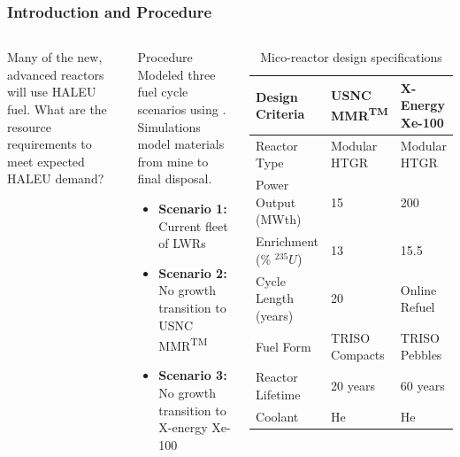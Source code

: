 \begin{frame}
  \frametitle{Introduction and Procedure}
  \begin{columns}
        \column[t]{5cm}
        Many of the new, advanced reactors will use \gls{HALEU} fuel. 
        What are the resource requirements to meet expected \gls{HALEU}
        demand?

        \begin{block}{Procedure}
            Modeled three fuel cycle scenarios using \Cyclus. Simulations 
            model materials from mine to final disposal.
            \begin{itemize}
                \item \textbf{Scenario 1:} Current fleet of \glspl{LWR}
                \item \textbf{Scenario 2:} No growth transition to \gls{USNC} \gls{MMR}\textsuperscript{TM}
                \item \textbf{Scenario 3:} No growth transition to X-energy Xe-100 
            \end{itemize}
 
        \end{block}
        
        \column[t]{5cm}
        \begingroup
        \renewcommand{\arraystretch}{1.5} %
        \begin{table}[t!]
            \tiny
            \caption{Mico-reactor design specifications}
            \label{tab:reactor_summary}
            \begin{tabular}{ p{1.5cm} p{1.5cm} p{1.25cm}}
                \hline
                Design Criteria & \gls{USNC} \gls{MMR}\textsuperscript{TM} & 
                    X-Energy Xe-100 \\\hline
                
                Reactor Type & Modular HTGR & Modular HTGR \\
                Power Output (MWth) & 15 & 200 \\
                Enrichment (\% $^{235}U$) & 13 & 15.5 \\
                Cycle Length (years) & 20 & Online Refuel\\
                Fuel Form & TRISO Compacts & TRISO Pebbles\\
                Reactor Lifetime & 20 years & 60 years \\
                Coolant & He & He \\
                \hline
            \end{tabular}
        \end{table}   
        \endgroup
  \end{columns}
        
\end{frame}


